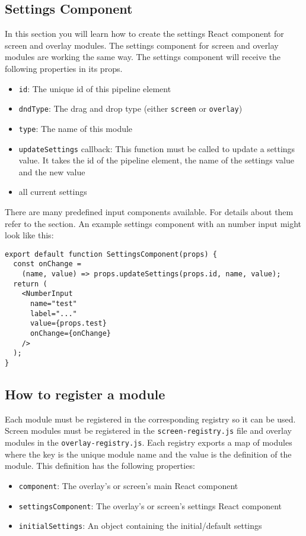 \subsection{Settings Component}
\label{sec:settings-component}
In this section you will learn how to create the settings React component for screen and overlay modules.
The settings component for screen and overlay modules are working the same way. 
The settings component will receive the following properties in its props.
\begin{itemize}
  \item \texttt{id}: The unique id of this pipeline element
  \item \texttt{dndType}: The drag and drop type (either \texttt{screen} or \texttt{overlay})
  \item \texttt{type}: The name of this module
  \item \texttt{updateSettings} callback: This function must be called to update a settings value. 
    It takes the id of the pipeline element, the name of the settings value and the new value
  \item all current settings
\end{itemize}

There are many predefined input components available. 
For details about them refer to the  section. 
An example settings component with an number input might look like this:
\begin{verbatim}
export default function SettingsComponent(props) {
  const onChange = 
    (name, value) => props.updateSettings(props.id, name, value);
  return (
    <NumberInput 
      name="test" 
      label="..." 
      value={props.test} 
      onChange={onChange} 
    />
  );
}
\end{verbatim}

\subsection{How to register a module}
Each module must be registered in the corresponding registry so it can be used. 
Screen modules must be registered in the \texttt{screen-registry.js} file and overlay modules in the \texttt{overlay-registry.js}. 
Each registry exports a map of modules where the key is the unique module name and the value is the definition of the module. 
This definition has the following properties:
\begin{itemize}
  \item \texttt{component}: The overlay's or screen's main React component
  \item \texttt{settingsComponent}: The overlay's or screen's settings React component
  \item \texttt{initialSettings}: An object containing the initial/default settings
\end{itemize}

